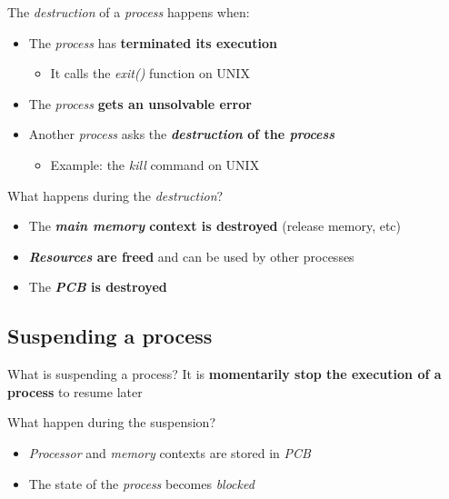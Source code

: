 \documentclass{beamer}[10pt, usepdftitle=false, handout]
\begin{document}
	\begin{frame}
	
	The \textit{destruction} of a \textit{process} happens when:
	\vspace*{1em}
	\begin{itemize}
	\item{The \textit{process} has \textbf{terminated its execution}
		\begin{itemize}
		\item{It calls the \textit{exit()} function on UNIX}
		\end{itemize}
	}
	\item{The \textit{process} \textbf{gets an unsolvable error}}
	\item{Another \textit{process} asks the \textbf{\textit{destruction} of the \textit{process}}
		\begin{itemize}
		\item{Example: the \textit{kill} command on UNIX}
		\end{itemize}			
	}
	\end{itemize}		
	\pause
	\vspace*{1em}
	
	\begin{block}{What happens during the \textit{destruction}?}	
	\begin{itemize}
		\item{The \textbf{\textit{main memory} context is destroyed} (release memory, etc)}
		\item{\textbf{\textit{Resources} are freed} and can be used by other processes}
		\item{The \textbf{\textit{PCB} is destroyed}}
	\end{itemize}
	\end{block}
	\end{frame}	
	
	\subsection{Suspending a process}	
	
	\begin{frame}
	
	\begin{block}{What is suspending a process?}
	It is \textbf{momentarily stop the execution of a process} to resume later
	\end{block}	
	
	\vspace*{1em}	
	
	\begin{block}{What happen during the suspension?}	
	\begin{itemize}
	\item{\textit{Processor} and \textit{memory} contexts are stored in \textit{PCB}}
	\item{The state of the \textit{process} becomes \textit{blocked}}
	\end{itemize}
	\end{block}	
	
	\end{frame}	
	
\end{document}
